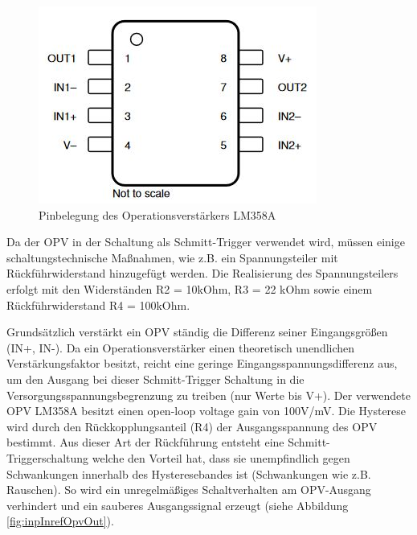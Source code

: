 \begin{figure}[H] %
\includegraphics[width=.45\textwidth]{sec4/images/OPV_Pinbelegung} 
\centering
\captionsetup{width=.95\textwidth}
\caption[Pinbelegung des Operationsverstärkers LM358A]{Pinbelegung des Operationsverstärkers LM358A}\centering
\label{fig:OPVPinbelegung}
\end{figure}


Da der \ac{OPV} in der Schaltung als Schmitt-Trigger verwendet wird, müssen einige schaltungstechnische Maßnahmen, wie z.B. ein Spannungsteiler mit Rückführwiderstand hinzugefügt werden. Die Realisierung des Spannungsteilers erfolgt mit den Widerständen R2 = 10kOhm, R3 = 22 kOhm sowie einem Rückführwiderstand R4 = 100kOhm.\vspace{11pt}

Grundsätzlich verstärkt ein \ac{OPV} ständig die Differenz seiner Eingangsgrößen (IN+, IN-). Da ein Operationsverstärker einen theoretisch unendlichen Verstärkungsfaktor besitzt, reicht eine geringe Eingangsspannungsdifferenz aus, um den Ausgang bei dieser Schmitt-Trigger Schaltung in die Versorgungsspannungsbegrenzung zu treiben (nur Werte bis V+). Der verwendete OPV LM358A besitzt einen \glqq{}open-loop voltage gain\grqq{} von 100V/mV. Die Hysterese wird durch den Rückkopplungsanteil (R4) der Ausgangsspannung des \ac{OPV} bestimmt. Aus dieser Art der Rückführung entsteht eine Schmitt-Triggerschaltung welche den Vorteil hat, dass sie unempfindlich gegen Schwankungen innerhalb des Hysteresebandes ist (Schwankungen wie z.B. Rauschen). So wird ein unregelmäßiges Schaltverhalten am \ac{OPV}-Ausgang verhindert und ein sauberes Ausgangssignal erzeugt (siehe Abbildung \ref{fig:inpInrefOpvOut}).\vspace{11pt}

